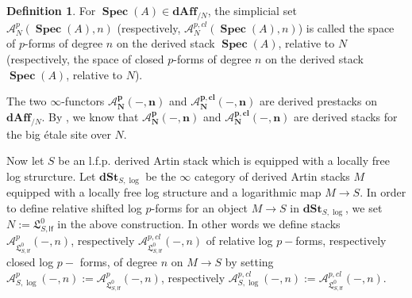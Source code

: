 \documentclass[11pt]{amsart}
\newcommand  {\dAff}     {\mathbf{dAff}}
\DeclareMathOperator{\Spec}{Spec}
\theoremstyle{plain}
\numberwithin{equation}{section}
\theoremstyle{definition}
\newtheorem{Def}{Definition}[section]
\theoremstyle{plain}
\begin{document}
\smallskip

\begin{Def}
For $\boldsymbol{\Spec} (A) \in \dAff_{/N}$, the simplicial set $\mathcal A^p_N(\boldsymbol{\Spec} (A),n)$ (respectively, $\mathcal A^{p,cl}_{N}(\boldsymbol{\Spec} (A),n)$) is called the space of $p$-forms of degree $n$ on the derived stack $\boldsymbol{\Spec} (A)$, relative to $N$ (respectively, the space of closed $p$-forms of degree $n$ on the derived stack $\boldsymbol{\Spec} (A)$, relative to $N$).
\end{Def}


\smallskip


\noindent
The two $\infty$-functors $\boldsymbol{\mathcal A^p_{N}(-,n)}$ and $\boldsymbol{\mathcal A^{p,cl}_N(-,n)}$ are derived prestacks on $\dAff_{/N}$. By \cite[Proposition 1.11]{PTVV}, we know that $\boldsymbol{\mathcal A^p_N(-,n)}$ and $\boldsymbol{\mathcal A^{p,cl}_{N}(-,n)}$ are derived stacks for the big \'{e}tale site over $N$. 

\smallskip

Now let $S$ be an l.f.p. derived Artin stack which is equipped with a locally free log strurcture. 
Let $\mathbf{dSt}_{S,\log}$ be the $\infty$ category of derived Artin stacks $M$ equipped with a locally free log structure and a logarithmic map   $M \to S$. In order to define relative shifted log $p$-forms for an object $M\longrightarrow S$ in $\mathbf{dSt}_{S,\log}$, we set  $N:=\mathfrak L^0_{S, \mathsf{lf}}$ in the above construction. In other words we define stacks $\boldsymbol{\mathcal A}^{p}_{\mathfrak L^0_{S, \mathsf{lf}}}(-, n)$, respectively $\boldsymbol{\mathcal A}^{p,cl}_{\mathfrak L^0_{S, \mathsf{lf}}}(-, n)$ of relative log $p-$forms, respectively closed log $p-$ forms,  of degree $n$ on $M \to S$ by setting $\boldsymbol{\mathcal A}^{p}_{S, \log}(-, n):= \boldsymbol{\mathcal A}^{p}_{\mathfrak L^0_{S, \mathsf{lf}}}(-, n)$, respectively $\boldsymbol{\mathcal A}^{p,cl}_{S, \log}(-, n):= \boldsymbol{\mathcal A}^{p,cl}_{\mathfrak L^0_{S, \mathsf{lf}}}(-, n)$.


\
\end{document}
